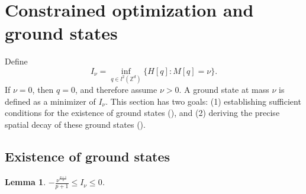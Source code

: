 \documentclass{article}
\numberwithin{equation}{section}
\newtheorem{lemma}{Lemma}[section]
\begin{document}
\section{Constrained optimization and ground states}\label{optimization}
Define
\begin{equation}\label{constrained}
    I_\nu = \inf_{q \in l^2(\mathbb{Z}^d)} \{H[q]: M[q] = \nu\}.
\end{equation}
If $\nu = 0$, then $q = 0$, and therefore assume $\nu > 0$. A ground state at mass $\nu$ is defined as a minimizer of $I_\nu$. This section has two goals: (1) establishing sufficient conditions for the existence of ground states (), and (2) deriving the precise spatial decay of these ground states ().

\subsection{Existence of ground states}
\begin{lemma}\label{l1}
$-\frac{\nu^{\frac{p+1}{2}}}{p+1} \leq I_\nu \leq 0$.
\end{lemma}
\end{document}
